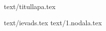 \documentclass[12pt,a4paper]{report}
\begin{document}
	 {text/titullapa.tex}
	\setcounter{page}{2}
	
	
	\tableofcontents
	 {text/ievads.tex}
	 {text/1.nodala.tex}
\end{document}
